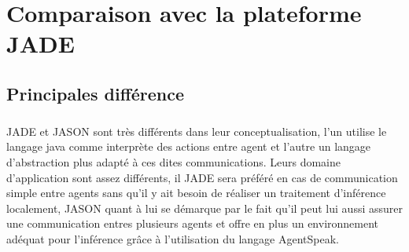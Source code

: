 \chapter{Comparaison avec la plateforme JADE}
\section{Principales différence}
\paragraph{}
JADE et JASON sont très différents dans leur conceptualisation, l'un utilise le langage java comme interprète des actions entre agent et l'autre un langage d'abstraction plus adapté à ces dites communications.
Leurs domaine d'application sont assez différents, il JADE sera préféré en cas de communication simple entre agents sans qu'il y ait besoin de réaliser un traitement d'inférence localement, JASON quant à lui se démarque par le fait qu'il peut lui aussi assurer une communication entres plusieurs agents et offre en plus un environnement adéquat pour l'inférence grâce à l'utilisation du langage AgentSpeak. 